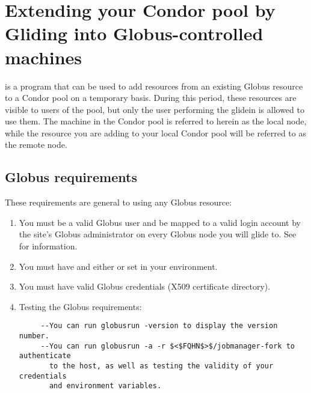 \section{\label{sec:Glidein}Extending your Condor pool by Gliding into Globus-controlled machines}

 is a program that can be used to add resources from an
existing Globus resource to a Condor 
pool on a temporary basis. During this period, these resources are visible 
to users of the pool, but only the user performing the glidein is allowed 
to use them. The machine in the Condor pool is referred to herein as the
local node, while the resource you are adding to your local Condor pool
will be referred to as the remote node.

\subsection{Globus requirements}
These requirements are general to using any Globus resource:
\begin{enumerate}

\item You must be a valid Globus user and be mapped to a valid login account by
the site's Globus administrator on every Globus node you will glide to.
See  for information.

\item You must have  and either  or 
 set in your environment.

\item You must have valid Globus credentials (X509 certificate directory).

\item Testing the Globus requirements:
\begin{verbatim}
     --You can run globusrun -version to display the version number.
     --You can run globusrun -a -r $<$FQHN$>$/jobmanager-fork to authenticate 
       to the host, as well as testing the validity of your credentials 
       and environment variables.
\end{verbatim}
\end{enumerate}

